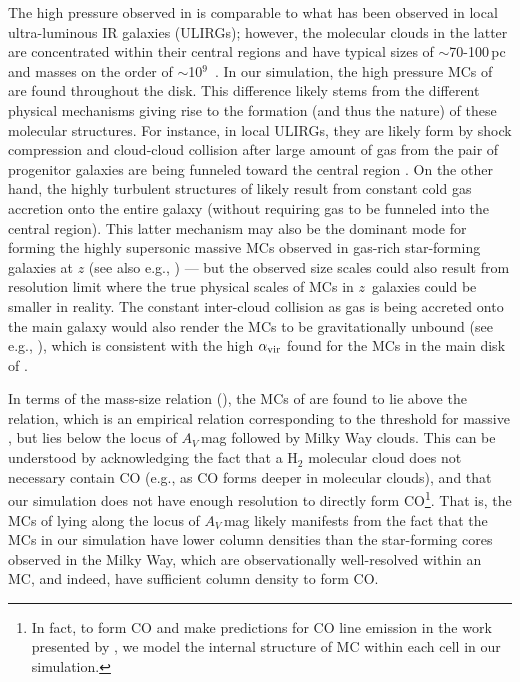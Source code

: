 \IfFileExists{emulateapjlegacy.cls}{\documentclass[iop]{emulateapjlegacy}}{\documentclass[iop]{emulateapj}}
\begin{document}
The high pressure observed in \flower is comparable to what has been 
observed in local ultra-luminous IR galaxies (ULIRGs); however, the
molecular clouds in the latter are concentrated within their 
central regions and have typical sizes of $\sim$70-100\,pc and masses on the order of $\sim$10$^9$\,\Msun
\citep{Downes98a, Sakamoto08a}. In our simulation, the high pressure MCs of \flower are
found throughout the disk. This difference likely stems from the different physical mechanisms giving rise
to the formation (and thus the nature) of these molecular structures.
For instance, in local ULIRGs, they are likely form by shock compression and cloud-cloud
collision after large amount of gas from the pair of progenitor galaxies
are being funneled toward the central region \citep{Tan00a, Wu18a}.  %
On the other hand, the highly turbulent structures of \flower likely result from 
constant cold gas accretion onto the entire galaxy (without
requiring gas to be funneled into the central region).
This latter mechanism may also be the dominant mode for forming the highly supersonic massive MCs observed
in gas-rich star-forming galaxies at $z$ (see also e.g., \citealt{Swinbank11a}) --- but the observed 
size scales could also result from resolution limit where the true physical scales of MCs in
$z$\, galaxies could be smaller in reality.
The constant inter-cloud collision as gas is being accreted onto the main galaxy would also render
the MCs to be gravitationally unbound (see e.g., \citealt{Dobbs11a}), which is 
consistent with the high $\alpha_{\rm vir}$ found for the MCs in the main disk of \flower.

In terms of the mass-size relation (), the MCs of \flower are found to lie above the \citet{Kauffmann10c} relation, 
which is an empirical relation corresponding to the threshold for massive \SF, but lies
below the locus of $A_V$\,mag followed by Milky Way clouds.
This can be understood by acknowledging the fact that a H$_2$ molecular cloud
does not necessary contain CO (e.g., as CO forms deeper in molecular clouds),
and that our simulation does not have enough resolution to directly form CO\footnote{
In fact, to form CO and make predictions for CO line emission in the work presented by \citet{Vallini18a}, we
model the internal structure of MC within each cell in our simulation.}.
That is, the MCs of \flower lying along the locus of $A_V$\,mag likely manifests from the
fact that the MCs in our simulation have lower column densities than the star-forming cores observed in the Milky Way, which are
observationally well-resolved within an MC, and indeed, have sufficient column density to form CO.
\end{document}
